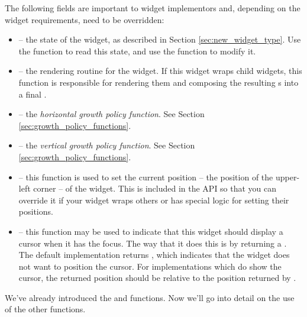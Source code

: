 The following fields are important to widget implementors and,
depending on the widget requirements, need to be overridden:

\begin{itemize}
\item {} -- the state of the widget, as described in Section
  \ref{sec:new_widget_type}.  Use the  function to read
  this state, and use the  function to modify
  it.
\item {} -- the rendering routine for the widget.  If this
  widget wraps child widgets, this function is responsible for
  rendering them and composing the resulting s into a final
  .
\item {} -- the \textit{horizontal growth policy
  function}.  See Section \ref{sec:growth_policy_functions}.
\item {} -- the \textit{vertical growth policy
  function}.  See Section \ref{sec:growth_policy_functions}.
\item {} -- this function is used to set the
  current position -- the position of the upper-left corner -- of the
  widget.  This is included in the  API so that you can
  override it if your widget wraps others or has special logic for
  setting their positions.
\item {} -- this function may be used to
  indicate that this widget should display a cursor when it has the
  focus.  The way that it does this is by returning a
  .  The default implementation returns
  , which indicates that the widget does not want to
  position the cursor.  For implementations which do show the cursor,
  the returned position should be relative to the position returned by
  .
\end{itemize}

We've already introduced the  and  functions.
Now we'll go into detail on the use of the other functions.
